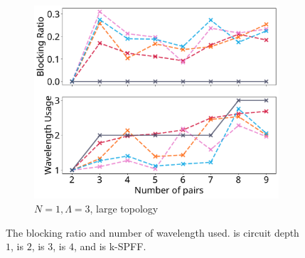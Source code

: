 \begin{figure}[H]
\begin{subfigure}{0.32\textwidth}
	\includegraphics[width=\textwidth]{pictures/plots/n_pairs/x-1-3-m.pdf}
	\caption{$N=1, {\Lambda} = 3$, large topology}
	\label{pairc}
	\end{subfigure}
\caption{\scriptsize The blocking ratio and number of wavelength used.
\protect\reddashed is circuit depth $1$,
\protect\peachdashed is $2$,
\protect\pinkdashed is $3$,
\protect\skydashed is $4$, and
\protect\blackline is k-SPFF.
\label{fig:pairs}
}
\end{figure}
